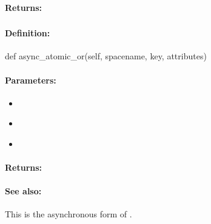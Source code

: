 \paragraph{Returns:}


\pagebreak
\subsubsection{}
\label{api:python:async_atomic_or}


\paragraph{Definition:}
\begin{pythoncode}
def async_atomic_or(self, spacename, key, attributes)
\end{pythoncode}

\paragraph{Parameters:}
\begin{itemize}[noitemsep]
\item {}\\

\item {}\\

\item {}\\

\end{itemize}

\paragraph{Returns:}


\paragraph{See also:}  This is the asynchronous form of .

\pagebreak
\subsubsection{}
\label{api:python:cond_atomic_or}


